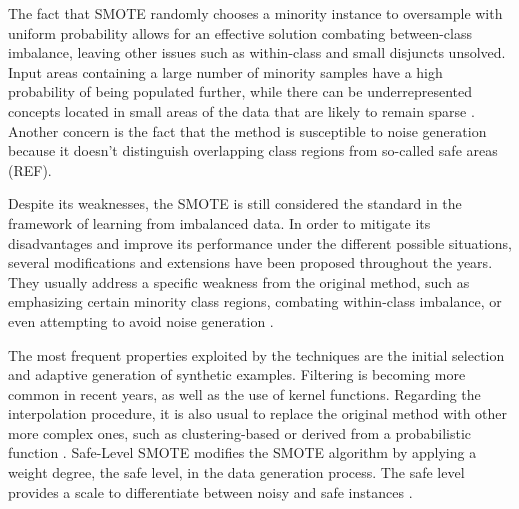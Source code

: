 \documentclass[parskip=full]{scrartcl}
\begin{document}
The fact that SMOTE randomly chooses a minority instance to oversample with 
uniform probability allows for an effective solution combating between-class 
imbalance, leaving other issues such as within-class and small disjuncts 
unsolved. Input areas containing a large number of minority samples have a high 
probability of being populated further, while there can be underrepresented 
concepts located in small areas of the data that are likely to remain sparse 
\cite{Fernandez2018}. Another concern is the fact that the method is 
susceptible to noise generation because it doesn’t distinguish overlapping 
class regions from so-called safe areas (REF).

Despite its weaknesses, the SMOTE is still considered the standard in the 
framework of learning from imbalanced data. In order to mitigate its 
disadvantages and improve its performance under the different possible 
situations, several modifications and extensions have been proposed throughout 
the years. They usually address a specific weakness from the original method, 
such as emphasizing certain minority class regions, combating within-class 
imbalance, or even attempting to avoid noise generation \cite{Douzas2018}.

The most frequent properties exploited by the techniques are the initial 
selection and adaptive generation of synthetic examples. Filtering is becoming 
more common in recent years, as well as the use of kernel functions. Regarding 
the interpolation procedure, it is also usual to replace the original method 
with other more complex ones, such as clustering-based or derived from a 
probabilistic function \cite{Fernandez2018}. Safe-Level SMOTE modifies the 
SMOTE algorithm by applying a weight degree, the safe level, in the data 
generation process. The safe level provides a scale to differentiate between 
noisy and safe instances \cite{Bunk2009}. 
\end{document}
